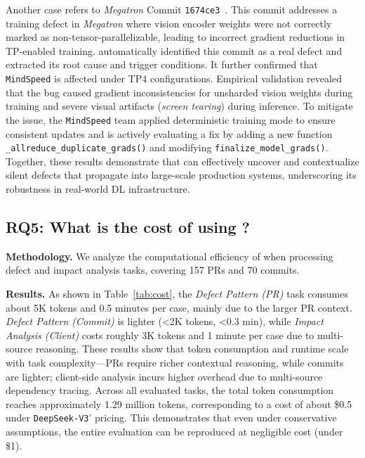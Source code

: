 Another case refers to \textit{Megatron} Commit \texttt{1674ce3}~\cite{1674ce3}.
This commit addresses a training defect in \textit{Megatron} where vision encoder weights were not correctly marked as non-tensor-parallelizable, leading to incorrect gradient reductions in TP-enabled training.
\appname automatically identified this commit as a real defect and extracted its root cause and trigger conditions. 
It further confirmed that \texttt{MindSpeed} is affected under TP4 configurations.
Empirical validation revealed that the bug caused gradient inconsistencies for unsharded vision weights during training and severe visual artifacts (\textit{screen tearing}) during inference.
To mitigate the issue, the \texttt{MindSpeed} team applied deterministic training mode to ensure consistent updates and is actively evaluating a fix by adding a new function \texttt{\_allreduce\_duplicate\_grads()} and modifying \texttt{finalize\_model\_grads()}.
Together, these results demonstrate that \appname can effectively uncover and contextualize silent defects that propagate into large-scale production systems, underscoring its robustness in real-world DL infrastructure.


\subsection{RQ5: What is the cost of using \appname?}
\noindent\textbf{Methodology.}
We analyze the computational efficiency of \appname when processing defect and impact analysis tasks, covering 157 PRs and 70 commits.


\noindent\textbf{Results.}
As shown in Table~\ref{tab:cost}, the \textit{Defect Pattern (PR)} task consumes about 5K tokens and 0.5 minutes per case, mainly due to the larger PR context.
\textit{Defect Pattern (Commit)} is lighter (<2K tokens, <0.3 min), while \textit{Impact Analysis (Client)} costs roughly 3K tokens and 1 minute per case due to multi-source reasoning.
These results show that token consumption and runtime scale with task complexity—PRs require richer contextual reasoning, while commits are lighter; client-side analysis incurs higher overhead due to multi-source dependency tracing.
Across all evaluated tasks, the total token consumption reaches approximately 1.29 million tokens, corresponding to a cost of about \$0.5 under \texttt{DeepSeek-V3}' pricing.
This demonstrates that even under conservative assumptions, the entire evaluation can be reproduced at negligible cost (under \$1).

